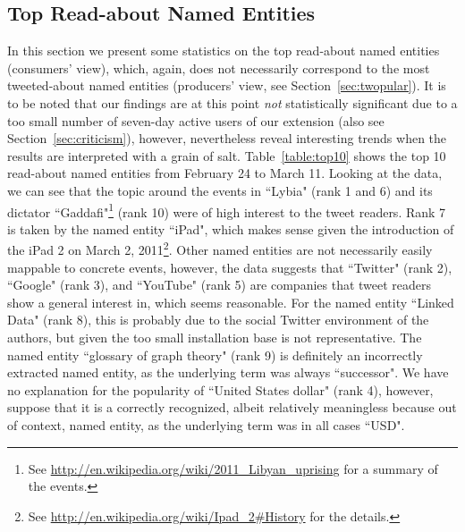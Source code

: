 \documentclass[runningheads,a4paper]{llncs}
\begin{document}
\subsection{Top Read-about Named Entities}
In this section we present some statistics on the top read-about named entities (consumers' view), which, again, does not necessarily correspond to the most tweeted-about named entities (producers' view, see Section~\ref{sec:twopular}). It is to be noted that our findings are at this point \textit{not} statistically significant due to a too small number of seven-day active users of our extension (also see Section~\ref{sec:criticism}), however, nevertheless reveal interesting trends when the results are interpreted with a grain of salt. Table~\ref{table:top10} shows the top 10 read-about named entities from February 24 to March 11. Looking at the data, we can see that the topic around the events in ``Lybia" (rank 1 and 6) and its dictator ``Gaddafi"\footnote{See \url{http://en.wikipedia.org/wiki/2011_Libyan_uprising} for a summary of the events.} (rank 10) were of high interest to the tweet readers. Rank 7 is taken by the named entity ``iPad", which makes sense given the introduction of the iPad 2 on March 2, 2011\footnote{See \url{http://en.wikipedia.org/wiki/Ipad_2#History} for the details.}. Other named entities are not necessarily easily mappable to concrete events, however, the data suggests that ``Twitter" (rank 2), ``Google" (rank 3), and ``YouTube" (rank 5) are companies that tweet readers show a general interest in, which seems reasonable. For the named entity ``Linked Data" (rank 8), this is probably due to the social Twitter environment of the authors, but given the too small installation base is not representative. The named entity ``glossary of graph theory" (rank 9) is definitely an incorrectly extracted named entity, as the underlying term was always ``successor". We have no explanation for the popularity of ``United States dollar" (rank 4), however, suppose that it is a correctly recognized, albeit relatively meaningless because out of context, named entity, as the underlying term was in all cases ``USD".
\end{document}

